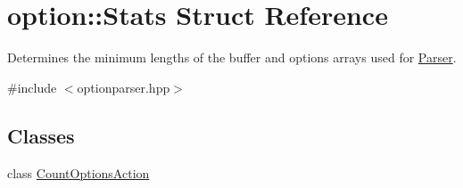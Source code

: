 \hypertarget{structoption_1_1Stats}{}\section{option\+:\+:Stats Struct Reference}
\label{structoption_1_1Stats}


Determines the minimum lengths of the buffer and options arrays used for \hyperlink{classoption_1_1Parser}{Parser}.  




{\ttfamily \#include $<$optionparser.\+hpp$>$}

\subsection*{Classes}
\begin{DoxyCompactItemize}
\item 
class \hyperlink{classoption_1_1Stats_1_1CountOptionsAction}{Count\+Options\+Action}
\end{DoxyCompactItemize}
